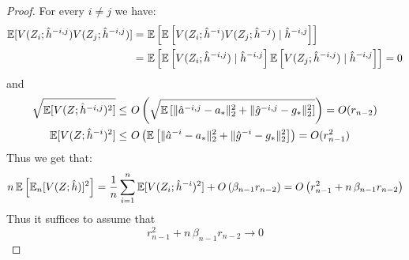 \begin{proof}
For every $i\neq j$ we have:
\begin{align}
    \mathbb{E}[V(Z_i; \hat{h}^{-i,j})  V(Z_j; \hat{h}^{-i,j})] =~& \mathbb{E}\left[\mathbb{E}\left[V(Z_i; \hat{h}^{-i})  V(Z_j; \hat{h}^{-j}) \mid \hat{h}^{-i,j}\right]\right]\\ 
    =~& \mathbb{E}\left[\mathbb{E}\left[V(Z_i;\hat{h}^{-i,j}) \mid \hat{h}^{-i,j}\right]  \mathbb{E}\left[V(Z_j; \hat{h}^{-i,j}) \mid \hat{h}^{-i,j}\right]\right] = 0
\end{align}
and
\begin{align}
\sqrt{\mathbb{E}[V(Z; \hat{h}^{-i,j})^2]} \leq~& O\left(\sqrt{\mathbb{E}\left[\|\hat{a}^{-i,j} - a_*\|_2^2 + \|\hat{g}^{-i,j} - g_*\|_2^2\right]}\right) = O(r_{n-2})\\
\mathbb{E}[V(Z; \hat{h}^{-i})^2] \leq~&  O\left(\mathbb{E}\left[\|\hat{a}^{-i} - a_*\|_2^2 + \|\hat{g}^{-i} - g_*\|_2^2\right]\right) = O(r_{n-1}^2)
\end{align}
Thus we get that:
\begin{equation}
    n\, \mathbb{E}\left[\mathbb{E}_n[V(Z; \hat{h})]^2\right] = \frac{1}{n} \sum_{i=1}^n \mathbb{E}[V(Z_i; \hat{h}^{-i})^2]  + O\left(\beta_{n-1} r_{n-2}\right)= O\left(r_{n-1}^2 + n\,\beta_{n-1} r_{n-2}\right)
\end{equation}
Thus it suffices to assume that
\begin{equation}
r_{n-1}^2 + n\,\beta_{n-1} r_{n-2}\to 0
\end{equation}
\end{proof}